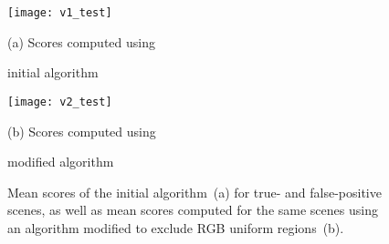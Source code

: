\begin{figure}[!h]
	\begin{minipage}[b]{0.49\linewidth}
		\centering
		\centerline{ \texttt{[image: v1\_test]} }
		\centerline{\scriptsize{(a) Scores computed using}}
		\centerline{\scriptsize{initial algorithm}}\medskip
	\end{minipage}
	\hfill
	\begin{minipage}[b]{0.49\linewidth}
		\centering
		\centerline{\texttt{[image: v2\_test]} }
		\centerline{\scriptsize{(b) Scores computed using}}
		\centerline{\scriptsize{modified algorithm}}\medskip
	\end{minipage}
    \caption{Mean scores of the initial algorithm~(a) for true- and false-positive
        scenes, as well as mean scores computed for the same scenes using an algorithm modified
        to exclude RGB uniform regions~(b).}
	\label{fig:textureless}
\end{figure}
